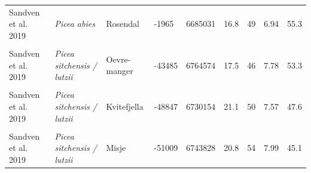 \documentclass[
]{article}
\begin{document}
\begin{landscape}
\begin{longtable}[t]{l>{}llllllll}
\addlinespace
Sandven et al. 2019 & \em{Picea abies} & Rosendal & -1965 & 6685031 & 16.8 & 49 & 6.94 & 55.3\\
\cellcolor{gray!6}{Sandven et al. 2019} & \em{\cellcolor{gray!6}{Picea sitchensis / lutzii}} & \cellcolor{gray!6}{Midtre-fjell} & \cellcolor{gray!6}{-47585} & \cellcolor{gray!6}{6729572} & \cellcolor{gray!6}{23.5} & \cellcolor{gray!6}{50} & \cellcolor{gray!6}{7.74} & \cellcolor{gray!6}{44.8}\\
Sandven et al. 2019 & \em{Picea sitchensis / lutzii} & Oevre-manger & -43485 & 6764574 & 17.5 & 46 & 7.78 & 53.3\\
\cellcolor{gray!6}{Sandven et al. 2019} & \em{\cellcolor{gray!6}{Picea sitchensis / lutzii}} & \cellcolor{gray!6}{Fuglavasstoppen} & \cellcolor{gray!6}{-50243} & \cellcolor{gray!6}{6740596} & \cellcolor{gray!6}{19.5} & \cellcolor{gray!6}{48} & \cellcolor{gray!6}{7.86} & \cellcolor{gray!6}{46.0}\\
Sandven et al. 2019 & \em{Picea sitchensis / lutzii} & Kvitefjella & -48847 & 6730154 & 21.1 & 50 & 7.57 & 47.6\\
\addlinespace
\cellcolor{gray!6}{Sandven et al. 2019} & \em{\cellcolor{gray!6}{Picea sitchensis / lutzii}} & \cellcolor{gray!6}{Kausland} & \cellcolor{gray!6}{-50236} & \cellcolor{gray!6}{6718477} & \cellcolor{gray!6}{22.2} & \cellcolor{gray!6}{44} & \cellcolor{gray!6}{7.84} & \cellcolor{gray!6}{46.2}\\
Sandven et al. 2019 & \em{Picea sitchensis / lutzii} & Misje & -51009 & 6743828 & 20.8 & 54 & 7.99 & 45.1\\*
\end{longtable}
\end{landscape}
\end{document}
